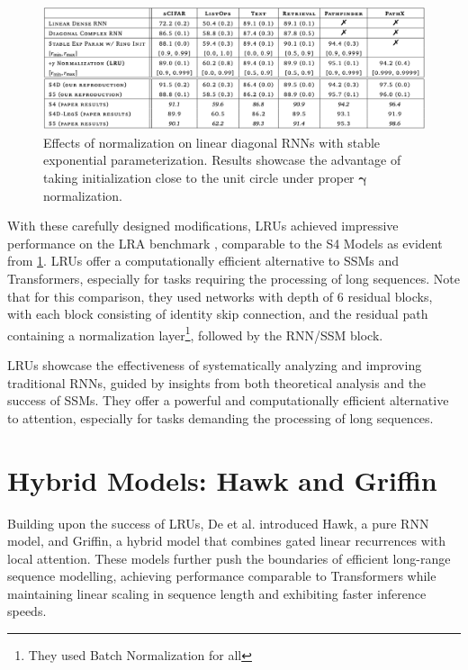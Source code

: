 \documentclass[12pt,a4paper]{report}
\begin{document}
\begin{figure}[ht]
    \centerline{\includegraphics[scale=0.65]{C5.2.4_LRU_Perf.png}}
    \caption{Effects of normalization on linear diagonal RNNs with stable exponential parameterization. Results showcase the advantage of taking initialization close to the unit circle under proper $\mathbf{\gamma}$ normalization.}
    \label{lru-perf}
\end{figure}

With these carefully designed modifications, LRUs achieved impressive performance on the LRA benchmark \cite{lra}, comparable to the S4 Models \cite{s4} as evident from \ref{lru-perf}. LRUs offer a computationally efficient alternative to SSMs and Transformers, especially for tasks requiring the processing of long sequences. Note that for this comparison, they used networks with depth of $6$ residual blocks, with each block consisting of identity skip connection, and the residual path containing a normalization layer\footnote{They used Batch Normalization for all}, followed by the RNN/SSM block.

\medskip

LRUs showcase the effectiveness of systematically analyzing and improving traditional RNNs, guided by insights from both theoretical analysis and the success of SSMs. They offer a powerful and computationally efficient alternative to attention, especially for tasks demanding the processing of long sequences.

\chapter{Hybrid Models: Hawk and Griffin}

Building upon the success of LRUs, De et al. \cite{hawkgriffin} introduced Hawk, a pure RNN model, and Griffin, a hybrid model that combines gated linear recurrences with local attention. These models further push the boundaries of efficient long-range sequence modelling, achieving performance comparable to Transformers \cite{transformers} while maintaining linear scaling in sequence length and exhibiting faster inference speeds.
\end{document}
